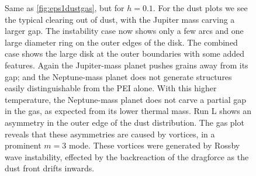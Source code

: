 \documentclass[onecolumn]{report}
\begin{document}
\begin{figure}
  \begin{center}
  \end{center}
  \caption{Same as \ref{fig:eps1dustgas}, but for $h=0.1$. For the dust
    plots we see the typical clearing out of dust, with the
    Jupiter mass carving a larger gap. The instability case now shows
    only a few arcs and one large diameter ring on the outer edges of
    the disk. The combined case shows the large disk at the outer
    boundaries with some added features. Again the Jupiter-mass planet
    pushes grains away from its gap; and the Neptune-mass planet does
    not generate structures easily distinguishable from the PEI
    alone. With this higher temperature, the Neptune-mass planet does
    not carve a partial gap in the gas, as expected from its lower thermal mass.
    Run L shows an asymmetry in the outer edge of the dust distribution.
    The gas plot reveals that these asymmetries are caused by vortices, in a
    prominent $m=3$ mode. These vortices were generated by Rossby wave instability,
    effected by the backreaction of the dragforce as the dust front drifts inwards.}
  \label{fig:h01dustgas}
  \end{figure} 
\end{document}
